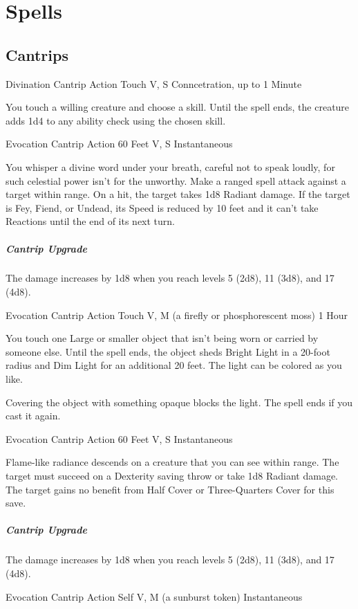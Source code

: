 \documentclass[letterpaper,openany,oneside,twocolumn]{book}
\begin{document}
\section*{Spells}
\subsection*{Cantrips}
	{Divination Cantrip}
	{Action}
	{Touch}
	{V, S}
	{Conncetration, up to 1 Minute}

You touch a willing creature and choose a skill. Until the spell ends, the creature adds 1d4 to any ability check using the chosen skill.

	{Evocation Cantrip}
	{Action}
	{60 Feet}
	{V, S}
	{Instantaneous}

You whisper a divine word under your breath, careful not to speak loudly, for such celestial power isn't for the unworthy. Make a ranged spell attack against a target within range. On a hit, the target takes 1d8 Radiant damage. If the target is Fey, Fiend, or Undead, its Speed is reduced by 10 feet and it can't take Reactions until the end of its next turn.

\subparagraph*{Cantrip Upgrade} The damage increases by 1d8 when you reach levels 5 (2d8), 11 (3d8), and 17 (4d8).

	{Evocation Cantrip}
	{Action}
	{Touch}
	{V, M (a firefly or phosphorescent moss)}
	{1 Hour}

You touch one Large or smaller object that isn't being worn or carried by someone else. Until the spell ends, the object sheds Bright Light in a 20-foot radius and Dim Light for an additional 20 feet. The light can be colored as you like.

Covering the object with something opaque blocks the light. The spell ends if you cast it again.

	{Evocation Cantrip}
	{Action}
	{60 Feet}
	{V, S}
	{Instantaneous}

Flame-like radiance descends on a creature that you can see within range. The target must succeed on a Dexterity saving throw or take 1d8 Radiant damage. The target gains no benefit from Half Cover or Three-Quarters Cover for this save.

\subparagraph*{Cantrip Upgrade} The damage increases by 1d8 when you reach levels 5 (2d8), 11 (3d8), and 17 (4d8).

	{Evocation Cantrip}
	{Action}
	{Self}
	{V, M (a sunburst token)}
	{Instantaneous}
\end{document}
